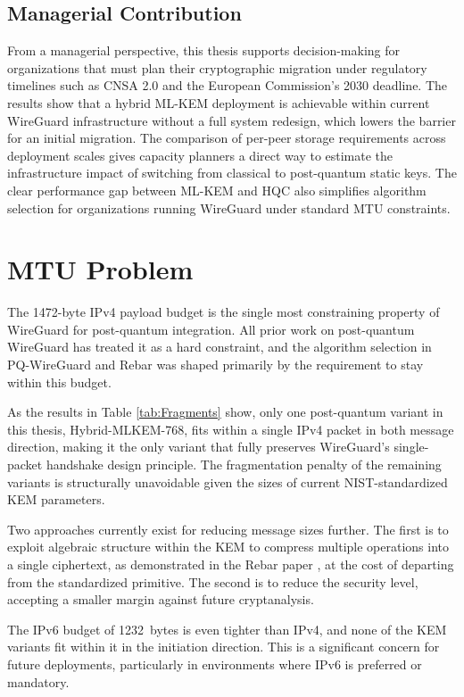 \subsection{Managerial Contribution} 
From a managerial perspective, this thesis supports decision-making for organizations that must plan their cryptographic migration under regulatory timelines such as CNSA 2.0 and the European Commission's 2030 deadline. The results show that a hybrid ML-KEM deployment is achievable within current WireGuard infrastructure without a full system redesign, which lowers the barrier for an initial migration. The comparison of per-peer storage requirements across deployment scales gives capacity planners a direct way to estimate the infrastructure impact of switching from classical to post-quantum static keys. The clear performance gap between ML-KEM and HQC also simplifies algorithm selection for organizations running WireGuard under standard MTU constraints. 


\section{MTU Problem}
The 1472-byte IPv4 payload budget is the single most constraining property of WireGuard for post-quantum integration. All prior work on post-quantum WireGuard has treated it as a hard constraint, and the algorithm selection in PQ-WireGuard \cite{pqwg} and Rebar \cite{rebar} was shaped primarily by the requirement to stay within this budget.

As the results in Table \ref{tab:Fragments} show, only one post-quantum variant in this thesis, Hybrid-MLKEM-768, fits within a single IPv4 packet in both message direction, making it the only variant that fully preserves WireGuard's single-packet handshake design principle. The fragmentation penalty of the remaining variants is structurally unavoidable given the sizes of current NIST-standardized KEM parameters.

Two approaches currently exist for reducing message sizes further. The first is to exploit algebraic structure within the KEM to compress multiple operations into a single ciphertext, as demonstrated in the Rebar paper \cite{rebar}, at the cost of departing from the standardized primitive. The second is to reduce the security level, accepting a smaller margin against future cryptanalysis.

The IPv6 budget of \qty{1232}{bytes} is even tighter than IPv4, and none of the KEM variants fit within it in the initiation direction. This is a significant concern for future deployments, particularly in environments where IPv6 is preferred or mandatory.


